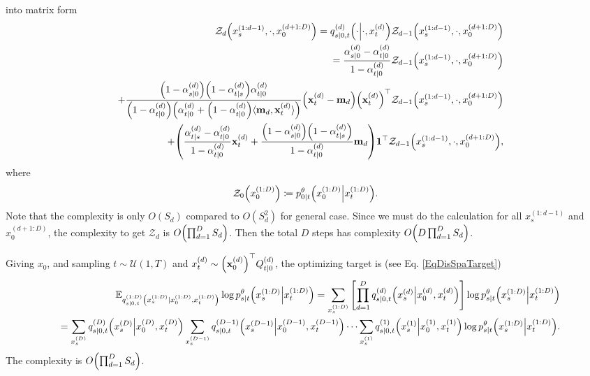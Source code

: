 \documentclass[10pt]{article}
\begin{document}
into matrix form
\begin{eqnarray*}
  &&\mathcal{Z}_d\qty(x^{(1:d-1)}_s, \cdot, x^{(d+1:D)}_0) = q_{s|0,t}^{(d)}\qty(\cdot\middle|\cdot, x_t^{(d)})\mathcal{Z}_{d-1}\qty(x_s^{(1:d-1)},\cdot,x_0^{(d+1:D)})\\
  &&=\frac{\alpha^{(d)}_{s|0}-\alpha^{(d)}_{t|0}}{1-\alpha^{(d)}_{t|0}} \mathcal{Z}_{d-1}\qty(x_s^{(1:d-1)},\cdot,x_0^{(d+1:D)})\\
  && + \frac{\qty(1-\alpha^{(d)}_{s|0})\qty(1-\alpha^{(d)}_{t|s})\alpha^{(d)}_{t|0}}{\qty(1-\alpha^{(d)}_{t|0})\qty(\alpha^{(d)}_{t|0}+\qty(1-\alpha^{(d)}_{t|0})\langle\mathbf{m}_d, \mathbf{x}^{(d)}_t\rangle)}\qty(\mathbf{x}^{(d)}_t - \mathbf{m}_d)\qty(\mathbf{x}^{(d)}_t)^\top\mathcal{Z}_{d-1}\qty(x_s^{(1:d-1)},\cdot,x_0^{(d+1:D)})\\
  && + \qty(\frac{\alpha^{(d)}_{t|s}-\alpha^{(d)}_{t|0}}{1-\alpha^{(d)}_{t|0}}\mathbf{x}^{(d)}_t + \frac{\qty(1-\alpha^{(d)}_{s|0})\qty(1-\alpha^{(d)}_{t|s})}{1-\alpha^{(d)}_{t|0}}\mathbf{m}_d)\mathbf{1}^\top\mathcal{Z}_{d-1}\qty(x_s^{(1:d-1)},\cdot,x_0^{(d+1:D)}),
\end{eqnarray*}
where
\begin{eqnarray*}
  \mathcal{Z}_0\qty(x_0^{(1:D)})\coloneq p^\theta_{0|t}\qty(x_0^{(1:D)}\middle|x_t^{(1:D)}).
\end{eqnarray*}
Note that the complexity is only $O(S_d)$ compared to $O(S_d^2)$ for general case. Since we must do the calculation for all $x_s^{(1:d-1)}$ and $x_0^{(d+1:D)}$, the complexity to get $\mathcal{Z}_d$ is $O\qty(\prod_{d=1}^D S_d)$. Then the total $D$ steps has complexity $O\qty(D\prod_{d=1}^D S_d)$. 

Giving $x_0$, and sampling $t\sim\mathcal{U}(1,T)$ and $x^{(d)}_t\sim \qty(\mathbf{x}^{(d)}_0)^\top Q^{(d)}_{t|0}$, the optimizing target is (see Eq. \eqref{EqDisSpaTarget})
\begin{eqnarray*}
  &&\mathbb{E}_{q^{(1:D)}_{s|0,t}\qty(x^{(1:D)}_s|x^{(1:D)}_0, x^{(1:D)}_t)}\log p^\theta_{s|t}\qty(x_s^{(1:D)}\middle|x_t^{(1:D)})=\sum_{x^{(1:D)}_s}\qty[\prod_{d=1}^D q^{(d)}_{s|0,t}\qty(x_s^{(d)}\middle|x_0^{(d)}, x_t^{(d)})]\log p^\theta_{s|t}\qty(x_s^{(1:D)}\middle|x_t^{(1:D)})\\
  &&=\sum_{x_s^{(D)}}q^{(D)}_{s|0,t}\qty(x_s^{(D)}\middle|x_0^{(D)}, x_t^{(D)})\sum_{x_s^{(D-1)}}q^{(D-1)}_{s|0,t}\qty(x_s^{(D-1)}\middle|x_0^{(D-1)}, x_t^{(D-1)})\cdots\sum_{x_s^{(1)}} q^{(1)}_{s|0,t}\qty(x_s^{(1)}\middle|x_0^{(1)}, x_t^{(1)})\log p^\theta_{s|t}\qty(x_s^{(1:D)}\middle|x_t^{(1:D)}).
\end{eqnarray*}
The complexity is $O\qty(\prod_{d=1}^D S_d)$.
\end{document}
